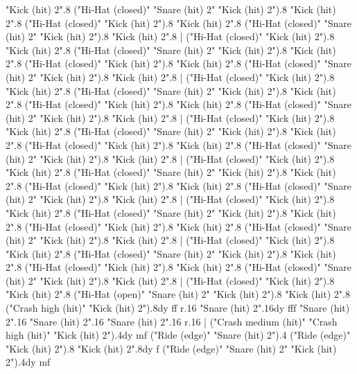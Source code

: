       "Kick (hit) 2".8
      ("Hi-Hat (closed)" "Snare (hit) 2" "Kick (hit) 2").8
      "Kick (hit) 2".8
      ("Hi-Hat (closed)" "Kick (hit) 2").8
      "Kick (hit) 2".8
      ("Hi-Hat (closed)" "Snare (hit) 2" "Kick (hit) 2").8
      "Kick (hit) 2".8
    |
      ("Hi-Hat (closed)" "Kick (hit) 2").8
      "Kick (hit) 2".8
      ("Hi-Hat (closed)" "Snare (hit) 2" "Kick (hit) 2").8
      "Kick (hit) 2".8
      ("Hi-Hat (closed)" "Kick (hit) 2").8
      "Kick (hit) 2".8
      ("Hi-Hat (closed)" "Snare (hit) 2" "Kick (hit) 2").8
      "Kick (hit) 2".8
    |
      ("Hi-Hat (closed)" "Kick (hit) 2").8
      "Kick (hit) 2".8
      ("Hi-Hat (closed)" "Snare (hit) 2" "Kick (hit) 2").8
      "Kick (hit) 2".8
      ("Hi-Hat (closed)" "Kick (hit) 2").8
      "Kick (hit) 2".8
      ("Hi-Hat (closed)" "Snare (hit) 2" "Kick (hit) 2").8
      "Kick (hit) 2".8
    |
      ("Hi-Hat (closed)" "Kick (hit) 2").8
      "Kick (hit) 2".8
      ("Hi-Hat (closed)" "Snare (hit) 2" "Kick (hit) 2").8
      "Kick (hit) 2".8
      ("Hi-Hat (closed)" "Kick (hit) 2").8
      "Kick (hit) 2".8
      ("Hi-Hat (closed)" "Snare (hit) 2" "Kick (hit) 2").8
      "Kick (hit) 2".8
    |
      ("Hi-Hat (closed)" "Kick (hit) 2").8
      "Kick (hit) 2".8
      ("Hi-Hat (closed)" "Snare (hit) 2" "Kick (hit) 2").8
      "Kick (hit) 2".8
      ("Hi-Hat (closed)" "Kick (hit) 2").8
      "Kick (hit) 2".8
      ("Hi-Hat (closed)" "Snare (hit) 2" "Kick (hit) 2").8
      "Kick (hit) 2".8
    |
      ("Hi-Hat (closed)" "Kick (hit) 2").8
      "Kick (hit) 2".8
      ("Hi-Hat (closed)" "Snare (hit) 2" "Kick (hit) 2").8
      "Kick (hit) 2".8
      ("Hi-Hat (closed)" "Kick (hit) 2").8
      "Kick (hit) 2".8
      ("Hi-Hat (closed)" "Snare (hit) 2" "Kick (hit) 2").8
      "Kick (hit) 2".8
    |
      ("Hi-Hat (closed)" "Kick (hit) 2").8
      "Kick (hit) 2".8
      ("Hi-Hat (closed)" "Snare (hit) 2" "Kick (hit) 2").8
      "Kick (hit) 2".8
      ("Hi-Hat (closed)" "Kick (hit) 2").8
      "Kick (hit) 2".8
      ("Hi-Hat (closed)" "Snare (hit) 2" "Kick (hit) 2").8
      "Kick (hit) 2".8
    |
      ("Hi-Hat (closed)" "Kick (hit) 2").8
      "Kick (hit) 2".8
      ("Hi-Hat (open)" "Snare (hit) 2" "Kick (hit) 2").8
      "Kick (hit) 2".8
      ("Crash high (hit)" "Kick (hit) 2").8{dy ff}
      r.16
      "Snare (hit) 2".16{dy fff}
      "Snare (hit) 2".16
      "Snare (hit) 2".16
      "Snare (hit) 2".16
      r.16
    |
      ("Crash medium (hit)" "Crash high (hit)" "Kick (hit) 2").4{dy mf}
      ("Ride (edge)" "Snare (hit) 2").4
      ("Ride (edge)" "Kick (hit) 2").8
      "Kick (hit) 2".8{dy f}
      ("Ride (edge)" "Snare (hit) 2" "Kick (hit) 2").4{dy mf}
